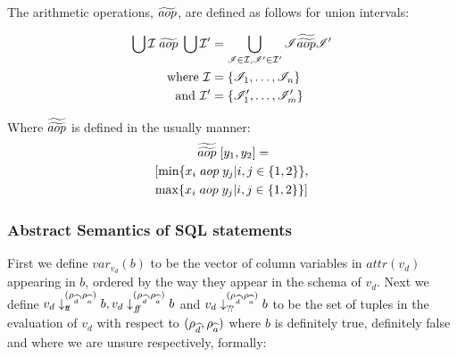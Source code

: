 The arithmetic operations, $\widetilde{aop}$, are defined as follows for union intervals:

\begin{align}\label{eq:abstractBOP}
    \bigcup \mathcal{I} \;\aab{aop}\; \bigcup \mathcal{I}' &= \bigcup_{\mathscr{I}\in \mathcal{I}, \mathscr{I}'\in \mathcal{I}'}\mathscr{I}\aaab{aop}\mathscr{I}'\nonumber\\
    \text{where } \mathcal{I}&=\{\mathscr{I}_1,\dots,\mathscr{I}_n\}\nonumber\\
    \text{and } \mathcal{I}'&=\{\mathscr{I}'_1,\dots,\mathscr{I}'_m\}
\end{align}

Where $\widetilde{\widetilde{aop}}$ is defined in the usually manner:
\begin{multline}
    [x_1, x_2] \; \aaab{aop} \; [y_1, y_2] = \\
    [\min\{x_i \; aop \; y_j | i,j \in \{1, 2\}\}, \\
    \max\{x_i \; aop \; y_j | i,j \in \{1, 2\}\}]
\end{multline}

\subsubsection{Abstract Semantics of SQL statements}\label{subsubsec:abstract-semantics-sql-statements}

First we define $var_{v_d}(b)$ to be the vector of column variables in $attr(v_d)$ appearing in $b$, ordered by the way they appear in the schema of $v_d$.
Next we define $v_d \downarrow_{t\!t}^{(\rho_{\widehat{d}}, \rho_{\widehat{a}})} b, v_d \downarrow_{f\!\!f}^{(\rho_{\widehat{d}}, \rho_{\widehat{a}})} b$ and  $v_d \downarrow_{?\!?}^{(\rho_{\widehat{d}}, \rho_{\widehat{a}})} b$ to be the set of tuples in the evaluation of $v_d$ with respect to $(\rho_{\widehat{d}}, \rho_{\widehat{a}})$ where $b$ is definitely true, definitely false and where we are unsure respectively, formally:


